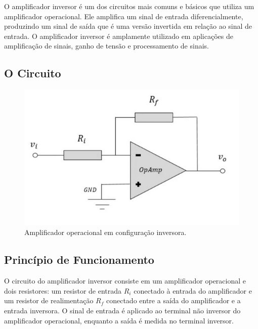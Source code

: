 \documentclass[12pt,twoside, a4paper, twocolumn]{article}
\begin{document}
O amplificador inversor é um dos circuitos mais comuns e básicos que utiliza um amplificador operacional. Ele amplifica um sinal de entrada diferencialmente, produzindo um sinal de saída que é uma versão invertida em relação ao sinal de entrada. O amplificador inversor é amplamente utilizado em aplicações de amplificação de sinais, ganho de tensão e processamento de sinais.




\subsection{O Circuito}




\begin{figure}[h]
    \centering
    \includegraphics[width=1\columnwidth]{images/opamp_inversor.png}
    \caption{Amplificador operacional em configuração inversora.}
\end{figure}




\subsection{Princípio de Funcionamento}






O circuito do amplificador inversor consiste em um amplificador operacional e dois resistores: um resistor de entrada $R_i$ conectado à entrada do amplificador e um resistor de realimentação $R_f$ conectado entre a saída do amplificador e a entrada inversora. O sinal de entrada é aplicado ao terminal não inversor do amplificador operacional, enquanto a saída é medida no terminal inversor.
\end{document}
